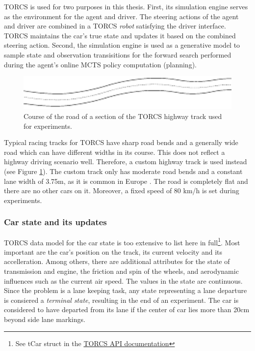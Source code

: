 TORCS is used for two purposes in this thesis. First, its simulation engine serves as the environment for the agent and driver. The steering actions of the agent and driver are combined in a TORCS \emph{robot} satisfying the driver interface. TORCS maintains the car's true state and updates it based on the combined steering action. Second, the simulation engine is used as a generative model to sample state and observation transisitions for the forward search performed during the agent's online MCTS policy computation (planning).  
 
 
\begin{figure}[htbp]
    \centerfloat
    \includegraphics[width=1.0\textwidth]{figures/track.pdf}
    \caption{Course of the road of a section of the TORCS highway track used for experiments.}
    \label{fig:track}
\end{figure}

Typical racing tracks for TORCS have sharp road bends and a generally wide road which can have different widths in its course. This does not reflect a highway driving scenario well. Therefore, a custom highway track is used instead (see Figure \ref{fig:track}). The custom track only has moderate road bends and a constant lane width of 3.75m, as it is common in Europe \parencite{lane_width}. The road is completely flat and there are no other cars on it. Moreover, a fixed speed of 80 km/h is set during experiments.

\subsubsection{Car state and its updates}
\label{sec:state}

TORCS data model for the car state is too extensive to list here in full\footnote{See tCar struct in the \href{https://sourceforge.net/projects/torcs/files/api-docs/}{TORCS API documentation}}. Most important are the car's position on the track, its current velocity and its accelleration. Among others, there are additional attributes for the state of transmission and engine, the friction and spin of the wheels, and aerodynamic influences such as the current air speed. The values in the state are continuous. Since the problem is a lane keeping task, any state representing a lane departure is consiered a \emph{terminal state}, resulting in the end of an experiment. The car is considered to have departed from its lane if the center of car lies more than 20cm beyond side lane markings.

